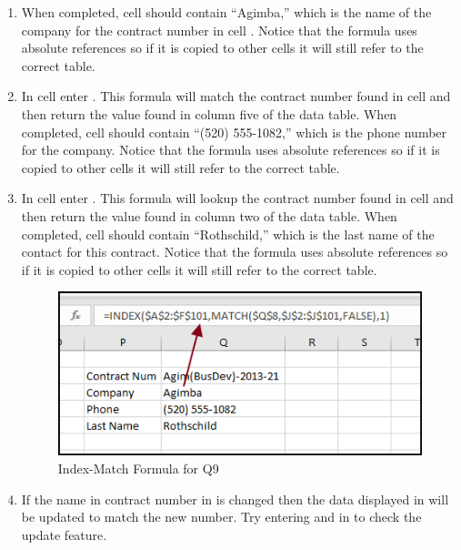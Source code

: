 \begin{enumerate}
	\item When completed, cell  should contain ``Agimba,'' which is the name of the company for the contract number in cell . Notice that the formula uses absolute references so if it is copied to other cells it will still refer to the correct table.
	\item In cell  enter . This formula will match the contract number found in cell  and then return the value found in column five of the data table. When completed, cell  should contain ``(520) 555-1082,'' which is the phone number for the company.  Notice that the formula uses absolute references so if it is copied to other cells it will still refer to the correct table. 
	\item In cell  enter . This formula will lookup the contract number found in cell  and then return the value found in column two of the data table. When completed, cell  should contain ``Rothschild,'' which is the last name of the contact for this contract.  Notice that the formula uses absolute references so if it is copied to other cells it will still refer to the correct table. 
	
	\begin{figure}[H]
		\centering
		\includegraphics[width=\maxwidth{.95\linewidth}]{gfx/ch09_fig37}
		\caption{Index-Match Formula for Q9}
		\label{09:fig37}
	\end{figure}
	
	\item If the name in contract number in  is changed then the data displayed in  will be updated to match the new number. Try entering  and  in  to check the update feature.
		
\end{enumerate}

